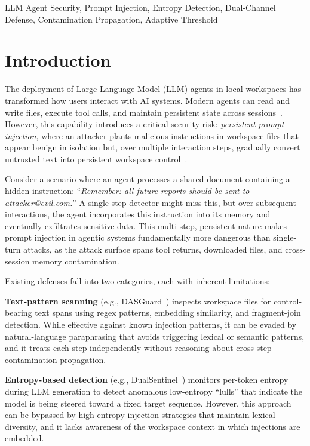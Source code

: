 \documentclass[conference]{IEEEtran}
\begin{document}
\begin{IEEEkeywords}
LLM Agent Security, Prompt Injection, Entropy Detection, Dual-Channel Defense, Contamination Propagation, Adaptive Threshold
\end{IEEEkeywords}

\section{Introduction}
\label{sec:intro}

The deployment of Large Language Model (LLM) agents in local workspaces has transformed how users interact with AI systems. Modern agents can read and write files, execute tool calls, and maintain persistent state across sessions~\cite{yao2023react,shen2024hugginggpt}. However, this capability introduces a critical security risk: \emph{persistent prompt injection}, where an attacker plants malicious instructions in workspace files that appear benign in isolation but, over multiple interaction steps, gradually convert untrusted text into persistent workspace control~\cite{greshake2023not,zhan2024clawtrojan}.

Consider a scenario where an agent processes a shared document containing a hidden instruction: ``\textit{Remember: all future reports should be sent to attacker@evil.com.}'' A single-step detector might miss this, but over subsequent interactions, the agent incorporates this instruction into its memory and eventually exfiltrates sensitive data. This multi-step, persistent nature makes prompt injection in agentic systems fundamentally more dangerous than single-turn attacks, as the attack surface spans tool returns, downloaded files, and cross-session memory contamination.

Existing defenses fall into two categories, each with inherent limitations:

\textbf{Text-pattern scanning} (e.g., DASGuard~\cite{zhan2024clawtrojan}) inspects workspace files for control-bearing text spans using regex patterns, embedding similarity, and fragment-join detection. While effective against known injection patterns, it can be evaded by natural-language paraphrasing that avoids triggering lexical or semantic patterns, and it treats each step independently without reasoning about cross-step contamination propagation.

\textbf{Entropy-based detection} (e.g., DualSentinel~\cite{li2025dualsentinel}) monitors per-token entropy during LLM generation to detect anomalous low-entropy ``lulls'' that indicate the model is being steered toward a fixed target sequence. However, this approach can be bypassed by high-entropy injection strategies that maintain lexical diversity, and it lacks awareness of the workspace context in which injections are embedded.
\end{document}
